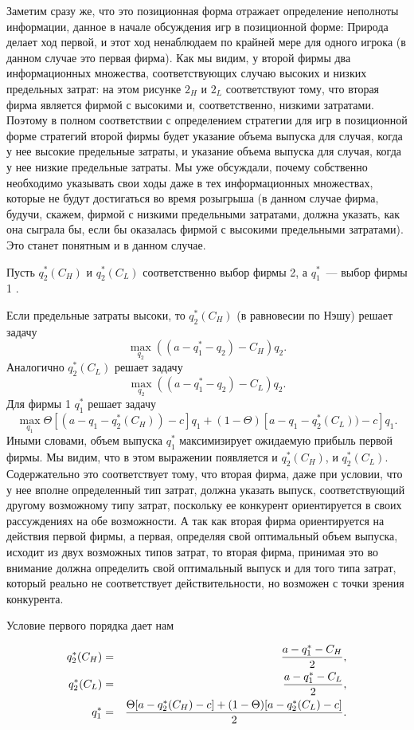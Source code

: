 Заметим сразу же, что это позиционная форма отражает определение неполноты
информации, данное в начале обсуждения игр в позиционной форме: Природа
делает ход первой, и этот ход ненаблюдаем по крайней мере для одного игрока
(в данном случае это первая фирма). Как мы видим, у второй фирмы два
информационных множества, соответствующих случаю высоких и низких предельных
затрат: на
этом рисунке $2_H$ и $2_L$ соответствуют тому, что вторая фирма является
фирмой с высокими и, соответственно, низкими затратами. Поэтому в полном
соответствии с определением стратегии для игр в
позиционной форме стратегий второй фирмы будет указание объема выпуска для
случая, когда у нее высокие предельные затраты, и указание объема выпуска для
случая, когда у нее низкие предельные затраты. Мы уже обсуждали, почему
собственно необходимо указывать свои ходы даже в тех информационных
множествах, которые не будут достигаться во время розыгрыша (в данном случае
фирма, будучи, скажем, фирмой с низкими предельными затратами, должна указать, как
она сыграла бы, если бы оказалась фирмой с высокими предельными затратами). Это
станет понятным и в данном случае.

Пусть $q_2^*(C_H)$ и $q_2^*(C_L)$ соответственно выбор фирмы 2, а
$q_1^*$~--- выбор фирмы 1 .

Если предельные затраты высоки, то $q_2^*(C_H)$ (в равновесии по Нэшу) решает
задачу
$$
\max_{q_2}((a-q_1^*-q_2)-C_H)q_2.
$$
Аналогично $q_2^*(C_L)$ решает задачу
$$
\max_{q_2}((a-q_1^*-q_2)-C_L)q_2.
$$
Для фирмы 1 $q_1^*$ решает задачу
$$
\max_{q_1}\Theta[(a-q_1-q_2^*(C_H))-c]q_1+(1-\Theta)[a-q_1-q^*_2(C_L))-c]q_1.
$$
Иными словами, объем выпуска $q_1^*$ максимизирует ожидаемую
прибыль первой фирмы. Мы видим, что в этом выражении
появляется и $q_2^*(C_H)$, и $q_2^*(C_L)$. Содержательно это
соответствует тому, что вторая фирма, даже при условии, что у нее
вполне определенный тип затрат, должна указать выпуск, соответствующий
другому возможному типу затрат, поскольку ее конкурент ориентируется в своих
рассуждениях на обе возможности. А так как вторая фирма ориентируется
на действия первой фирмы, а первая, определяя свой оптимальный объем выпуска,
исходит из двух возможных типов затрат, то вторая фирма, принимая это во внимание
должна определить свой оптимальный выпуск и для того типа затрат, который реально
не соответствует действительности, но возможен с точки зрения конкурента.


Условие первого порядка дает нам

\begin{center}
\begin{eqnarray}
q_2^*(C_H)&=&{{a-q_1^*-C_H}\over 2},\nonumber\\
q_2^*(C_L)&=&{{a-q_1^*-C_L}\over 2},\nonumber\\
q^*_1&=&{\frac{\Theta[a-q^*_2(C_H)-c]+(1-\Theta)[a-q_2^*(C_L)-c]}{2}}.\nonumber
\end{eqnarray}
\end{center}

